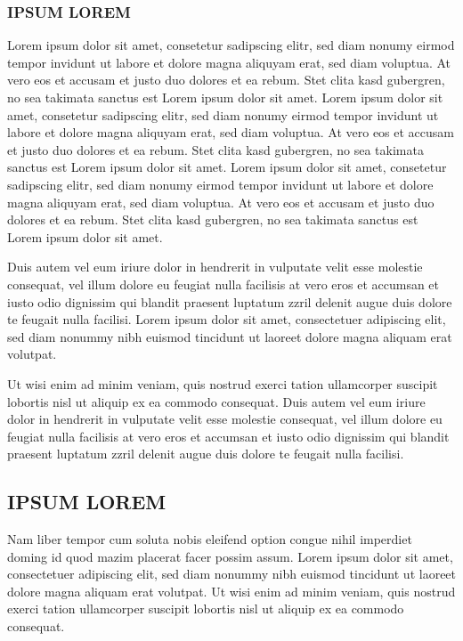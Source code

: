 \documentclass[]{../metanetpaper}
\begin{document}
\subsubsection{IPSUM LOREM} 
Lorem ipsum dolor sit amet, consetetur sadipscing elitr, sed diam nonumy eirmod tempor invidunt ut labore et dolore magna aliquyam erat, sed diam voluptua. At vero eos et accusam et justo duo dolores et ea rebum. Stet clita kasd gubergren, no sea takimata sanctus est Lorem ipsum dolor sit amet. Lorem ipsum dolor sit amet, consetetur sadipscing elitr, sed diam nonumy eirmod tempor invidunt ut labore et dolore magna aliquyam erat, sed diam voluptua. At vero eos et accusam et justo duo dolores et ea rebum. Stet clita kasd gubergren, no sea takimata sanctus est Lorem ipsum dolor sit amet. Lorem ipsum dolor sit amet, consetetur sadipscing elitr, sed diam nonumy eirmod tempor invidunt ut labore et dolore magna aliquyam erat, sed diam voluptua. At vero eos et accusam et justo duo dolores et ea rebum. Stet clita kasd gubergren, no sea takimata sanctus est Lorem ipsum dolor sit amet.   

Duis autem vel eum iriure dolor in hendrerit in vulputate velit esse molestie consequat, vel illum dolore eu feugiat nulla facilisis at vero eros et accumsan et iusto odio dignissim qui blandit praesent luptatum zzril delenit augue duis dolore te feugait nulla facilisi. Lorem ipsum dolor sit amet, consectetuer adipiscing elit, sed diam nonummy nibh euismod tincidunt ut laoreet dolore magna aliquam erat volutpat.   

Ut wisi enim ad minim veniam, quis nostrud exerci tation ullamcorper suscipit lobortis nisl ut aliquip ex ea commodo consequat. Duis autem vel eum iriure dolor in hendrerit in vulputate velit esse molestie consequat, vel illum dolore eu feugiat nulla facilisis at vero eros et accumsan et iusto odio dignissim qui blandit praesent luptatum zzril delenit augue duis dolore te feugait nulla facilisi.   
\subsection{IPSUM LOREM}
Nam liber tempor cum soluta nobis eleifend option congue nihil imperdiet doming id quod mazim placerat facer possim assum. Lorem ipsum dolor sit amet, consectetuer adipiscing elit, sed diam nonummy nibh euismod tincidunt ut laoreet dolore magna aliquam erat volutpat. Ut wisi enim ad minim veniam, quis nostrud exerci tation ullamcorper suscipit lobortis nisl ut aliquip ex ea commodo consequat.   
\end{document}
